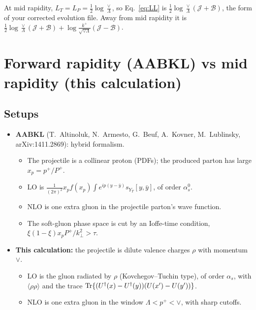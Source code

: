 \documentclass[11pt]{article}
\numberwithin{equation}{section}
\newcommand{\JJ}{\mathcal J}
\newcommand{\BB}{\mathcal B}
\newcommand{\LT}{L_T}
\newcommand{\LP}{L_P}
\begin{document}
At mid rapidity, $\LT=\LP=\frac12\log\frac\vee\Lambda$, so Eq.~\eqref{eq:LL} is $\frac12\log\frac\vee\Lambda(\JJ+\BB)$, the form of your corrected evolution file. Away from mid rapidity it is $\frac12\log\frac\vee\Lambda(\JJ+\BB)+\log\frac{k^+}{\sqrt{\vee\Lambda}}(\JJ-\BB)$.

\section{Forward rapidity (AABKL) vs mid rapidity (this calculation)}\label{sec:aabkl}
\subsection{Setups}
\begin{itemize}
\item \textbf{AABKL} (T.~Altinoluk, N.~Armesto, G.~Beuf, A.~Kovner, M.~Lublinsky, arXiv:1411.2869): hybrid formalism.
\begin{itemize}
\item The projectile is a collinear proton (PDFs); the produced parton has large $x_p=p^+/P^+$.
\item LO is $\frac{1}{(2\pi)^2}x_pf(x_p)\int e^{ip(y-\bar y)}s_{Y_T}[y,\bar y]$, of order $\alpha_s^0$.
\item NLO is one extra gluon in the projectile parton's wave function.
\item The soft-gluon phase space is cut by an Ioffe-time condition, $\xi(1-\xi)x_pP^+/k_\perp^2>\tau$.
\end{itemize}
\item \textbf{This calculation:} the projectile is dilute valence charges $\rho$ with momentum $\vee$.
\begin{itemize}
\item LO is the gluon radiated by $\rho$ (Kovchegov--Tuchin type), of order $\alpha_s$, with $\langle\rho\rho\rangle$ and the trace ${\rm Tr}\{(U^\dagger(x)-U^\dagger(y))(U(x')-U(y'))\}$.
\item NLO is one extra gluon in the window $\Lambda<p^+<\vee$, with sharp cutoffs.
\end{itemize}
\end{itemize}
\end{document}
